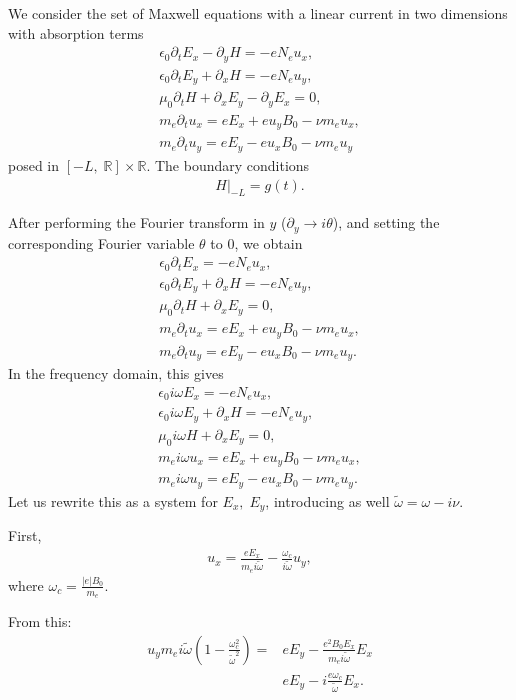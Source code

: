 \documentclass[a4paper,10pt]{article}
\begin{document}
We consider the set of Maxwell equations with a linear current in two dimensions \cite{stable_yee_plasma_current}
 with absorption terms
\begin{align*}
\epsilon_0\partial_t E_{x}-\partial_y H=-eN_e u_x,\\
\epsilon_0\partial_t E_{y}+\partial_x H=-eN_e u_y,\\
\mu_0\partial_t H+\partial_x E_y-\partial_y E_x=0,\\
m_e\partial_t u_x=eE_x+eu_yB_0-\nu m_e u_x,\\
m_e\partial_t u_y=eE_y-eu_xB_0-\nu m_e u_y
\end{align*}
posed in $[-L,\; \mathbb{R}]\times \mathbb{R}$. The boundary conditions 
\begin{align*}
 H|_{-L}=g(t).
\end{align*}

After performing the Fourier transform in $y$ ($\partial_y\rightarrow i\theta $), and setting the 
corresponding Fourier variable $\theta$ to $0$, we obtain
\begin{align*}
 \epsilon_0 \partial_t E_x=-eN_e u_x,\\
 \epsilon_0\partial_t E_y+\partial_x H=-e N_e u_y,\\
 \mu_0\partial_t H+\partial_x E_y=0,\\
m_e\partial_t u_x=eE_x+eu_yB_0-\nu m_e u_x,\\
m_e\partial_t u_y=eE_y-eu_xB_0-\nu m_e u_y.
\end{align*}
In the frequency domain, this gives 
\begin{align*}
 \epsilon_0 i\omega E_x=-e N_e u_x,\\
 \epsilon_0 i\omega E_y+\partial_x H=-e N_e u_y,\\
 \mu_0 i\omega H +\partial_x E_y=0,\\
 m_e i\omega u_x=eE_x+eu_y B_0-\nu m_e u_x,\\
  m_e i\omega u_y=eE_y-eu_x B_0-\nu m_e u_y.
\end{align*}
Let us rewrite this as a system for $E_x,\; E_y$, introducing as well $\tilde{\omega}=\omega-i\nu$.

First, 
\begin{align*}
 u_x=\frac{e E_x}{m_ei\tilde{\omega}}-\frac{\omega_c}{i\tilde{\omega}}u_y,
\end{align*}
where $\omega_c=\frac{|e|B_0}{m_e}$. 

From this:
\begin{align*}
 u_y m_e i\tilde{\omega}\left(1-\frac{\omega_c^2}{\tilde{\omega}^2}\right)=&eE_y-\frac{e^2 B_0 E_x}{m_ei\tilde{\omega}}E_x\\
 & eE_y-i\frac{e\omega_c}{\tilde{\omega}} E_x.
\end{align*}
\end{document}
